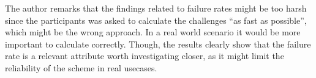

\begin{remark}
    The author remarks that the findings related to failure rates might be too harsh since the participants was asked to calculate the challenges ``as fast as possible'', which might be the wrong approach. In a real world scenario it would be more important to calculate correctly. Though, the results clearly show that the failure rate is a relevant attribute worth investigating closer, as it might limit the reliability of the scheme in real usecases.
\end{remark}



